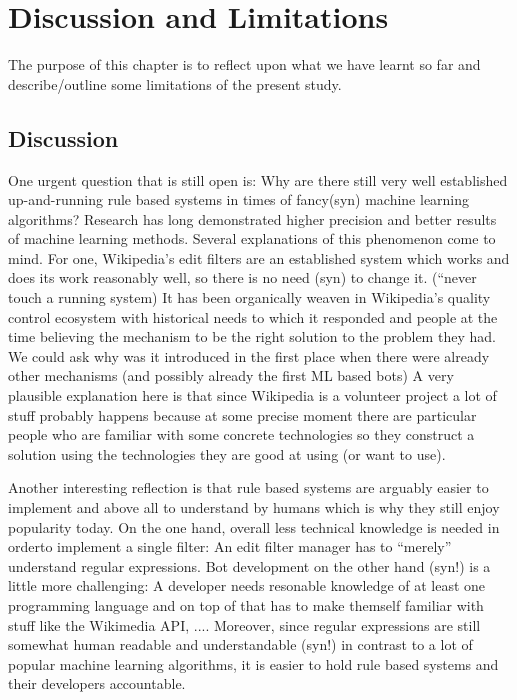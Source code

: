 \chapter{Discussion and Limitations}
\label{chap:discussion}

The purpose of this chapter is to reflect upon what we have learnt so far and describe/outline some limitations of the present study.

\section{Discussion}

One urgent question that is still open is:
Why are there still very well established up-and-running rule based systems in times of fancy(syn) machine learning algorithms?
Research has long demonstrated higher precision and better results of machine learning methods. %
Several explanations of this phenomenon come to mind.
For one, Wikipedia's edit filters are an established system which works and does its work reasonably well, so there is no need (syn) to change it. (``never touch a running system)
It has been organically weaven in Wikipedia's quality control ecosystem with historical needs to which it responded and people at the time believing the mechanism to be the right solution to the problem they had.
We could ask why was it introduced in the first place when there were already other mechanisms (and possibly already the first ML based bots) %
A very plausible explanation here is that since Wikipedia is a volunteer project a lot of stuff probably happens because at some precise moment there are particular people who are familiar with some concrete technologies so they construct a solution using the technologies they are good at using (or want to use).

Another interesting reflection is that rule based systems are arguably easier to implement and above all to understand by humans which is why they still enjoy popularity today.
On the one hand, overall less technical knowledge is needed in orderto implement a single filter:
An edit filter manager has to ``merely'' understand regular expressions.
Bot development on the other hand (syn!) is a little more challenging:
A developer needs resonable knowledge of at least one programming language and on top of that has to make themself familiar with stuff like the Wikimedia API, ....
Moreover, since regular expressions are still somewhat human readable and understandable (syn!) in contrast to a lot of popular machine learning algorithms, it is easier to hold rule based systems and their developers accountable.

